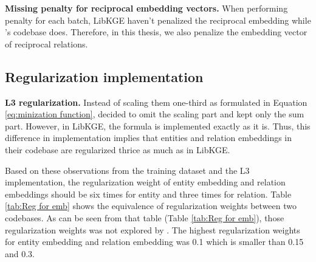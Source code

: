 \noindent\textbf{Missing penalty for reciprocal embedding vectors.} When performing penalty for each batch, LibKGE haven't penalized the reciprocal embedding while \citet{chen2021relation}'s codebase does. Therefore, in this thesis, we also penalize the embedding vector of reciprocal relations.


\subsection{Regularization implementation}


\noindent\textbf{L3 regularization.} Instead of scaling them one-third as formulated in Equation \ref{eq:minization function}, \citet{chen2021relation} decided to omit the scaling part and kept only the sum part. However, in LibKGE, the formula is implemented exactly as it is. Thus, this difference in implementation implies that entities and relation embeddings in their codebase are regularized thrice as much as in LibKGE.

Based on these observations from the training dataset and the L3 implementation, the regularization weight of entity embedding and relation embeddings should be six times for entity and three times for relation. Table \ref{tab:Reg for emb} shows the equivalence of regularization weights between two codebases. As can be seen from that table (Table \ref{tab:Reg for emb}), those regularization weights was not explored by \cite{Ruffinelli2020You}. The highest regularization weights for entity embedding and relation embedding was 0.1 \cite{Ruffinelli2020You} which is smaller than 0.15 and 0.3.
\newline

